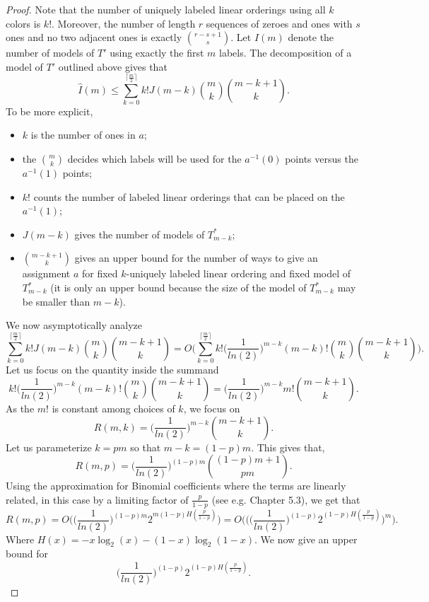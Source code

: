\documentclass[11pt]{amsart}
\theoremstyle{definition}
\begin{document}
\begin{proof}
    Note that the number of uniquely labeled linear orderings using all $k$ colors is $k!$.
    Moreover, the number of length $r$ sequences of zeroes and ones with $s$ ones and no two adjacent ones is exactly ${r-s+1 \choose s}$.
    Let $\hat{I}(m)$ denote the number of models of $T'$ using exactly the first $m$ labels.
    The decomposition of a model of $T'$ outlined above gives that
    \[ \hat{I}(m)\leq \sum_{k=0}^{\lceil \frac{m}2\rceil} k!J(m-k){m \choose k}{m-k+1 \choose k}.\]
    To be more explicit,
    \begin{itemize}
        \item $k$ is the number of ones in $a$;
        \item the ${m \choose k}$ decides which labels will be used for the $a^{-1}(0)$ points versus the $a^{-1}(1)$ points;
        \item $k!$ counts the number of labeled linear orderings that can be placed on the $a^{-1}(1)$;
        \item $J(m-k)$ gives the number of models of $T^*_{m-k}$;
        \item ${m-k+1 \choose k}$ gives an upper bound for the number of ways to give an assignment $a$ for fixed $k$-uniquely labeled linear ordering and fixed model of $T^*_{m-k}$ (it is only an upper bound because the size of the model of $T^*_{m-k}$ may be smaller than $m-k$).
    \end{itemize} 
    We now asymptotically analyze 
    \[\sum_{k=0}^{\lceil \frac{m}2\rceil} k!J(m-k){m \choose k}{m-k+1 \choose k}=O\Bigg(\sum_{k=0}^{\lceil \frac{m}2\rceil}k!\Big(\frac1{ln(2)}\Big)^{m-k}(m-k)!{m \choose k}{m-k+1 \choose k}\Bigg).\]
    Let us focus on the quantity inside the summand
    \[k!\big(\frac1{ln(2)}\big)^{m-k}(m-k)!{m \choose k}{m-k+1 \choose k}=\Big(\frac1{ln(2)}\Big)^{m-k}m!{m-k+1 \choose k}.\]
    As the $m!$ is constant among choices of $k$, we focus on
    \[R(m,k)=\Big(\frac1{ln(2)}\Big)^{m-k}{m-k+1 \choose k}.\]
    Let us parameterize $k=pm$ so that $m-k=(1-p)m$.
    This gives that,
    \[R(m,p)=\Big(\frac1{ln(2)}\Big)^{(1-p)m}{(1-p)m+1 \choose pm}. \]
    Using the approximation for Binomial coefficients where the terms are linearly related, in this case by a limiting factor of $\frac{p}{1-p}$ (see e.g. \cite{asymptopia} Chapter 5.3), we get that
    \[R(m,p)=O\Bigg(\Big(\frac1{ln(2)}\Big)^{(1-p)m}2^{m(1-p)H(\frac{p}{1-p})}\Bigg)=O\Bigg(\Big(\Big(\frac1{ln(2)}\Big)^{(1-p)}2^{(1-p)H(\frac{p}{1-p})}\Big)^m\Bigg). \]
    Where $H(x)=-x\log_2(x)-(1-x)\log_2(1-x)$.
    We now give an upper bound for
    \[\Big(\frac1{ln(2)}\Big)^{(1-p)}2^{(1-p)H(\frac{p}{1-p})}.\]

\end{proof}
\end{document}
